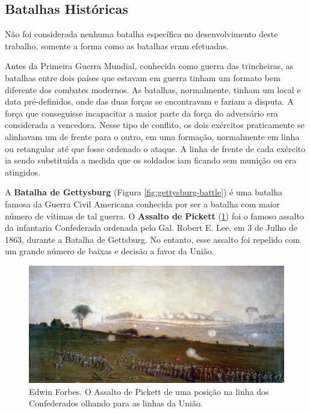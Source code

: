 \documentclass{article}
\begin{document}
\subsection{Batalhas Históricas}

Não foi considerada nenhuma batalha específica no desenvolvimento deste trabalho, somente a forma como as batalhas eram efetuadas.

Antes da Primeira Guerra Mundial, conhecida como guerra das trincheiras, as batalhas entre dois países que estavam em guerra tinham um formato bem diferente dos combates modernos. As batalhas, normalmente, tinham um local e data pré-definidos, onde das duas forças se encontravam e faziam a disputa. A força que conseguisse incapacitar a maior parte da força do adversário era considerada a vencedora. Nesse tipo de conflito, os dois exércitos praticamente se alinhavam um de frente para o outro, em uma formação, normalmente em linha ou retangular até que fosse ordenado o ataque. A linha de frente de cada exército ia sendo substituída a medida que os soldados iam ficando sem munição ou era atingidos. 

A \textbf{Batalha de Gettysburg} (Figura \ref{fig:gettysburg-battle}) é uma batalha famosa da Guerra Civil Americana conhecida por ser a batalha com maior número de vítimas de tal guerra. O \textbf{Assalto de Pickett} (\ref{fig:picketts-charge}) foi o famoso assalto da infantaria Confederada ordenada pelo Gal. Robert E. Lee, em 3 de Julho de 1863, durante a Batalha de Gettsburg. No entanto, esse assalto foi repelido com um grande número de baixas e decisão a favor da União.

\begin{figure}[ht]
	\centering
	\includegraphics[width=0.9\linewidth]{figs/edwin_forbes_picketts_charge_1420x654.jpg}
	\caption{Edwin Forbes. O Assalto de Pickett de uma posição na linha dos Confederados olhando para as linhas da União.}
	\label{fig:picketts-charge}
\end{figure}
\end{document}
